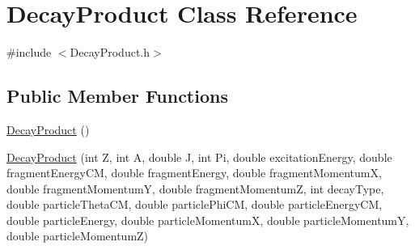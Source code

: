 \hypertarget{classDecayProduct}{\section{Decay\-Product Class Reference}
\label{classDecayProduct}
}


{\ttfamily \#include $<$Decay\-Product.\-h$>$}

\subsection*{Public Member Functions}
\begin{DoxyCompactItemize}
\item 
\hyperlink{classDecayProduct_adab401b347eca4def5a2ffbb61dd73d4}{Decay\-Product} ()
\item 
\hyperlink{classDecayProduct_aa4252af501362ad0cc982125cad9aaf4}{Decay\-Product} (int Z, int A, double J, int Pi, double excitation\-Energy, double fragment\-Energy\-C\-M, double fragment\-Energy, double fragment\-Momentum\-X, double fragment\-Momentum\-Y, double fragment\-Momentum\-Z, int decay\-Type, double particle\-Theta\-C\-M, double particle\-Phi\-C\-M, double particle\-Energy\-C\-M, double particle\-Energy, double particle\-Momentum\-X, double particle\-Momentum\-Y, double particle\-Momentum\-Z)
\end{DoxyCompactItemize}
